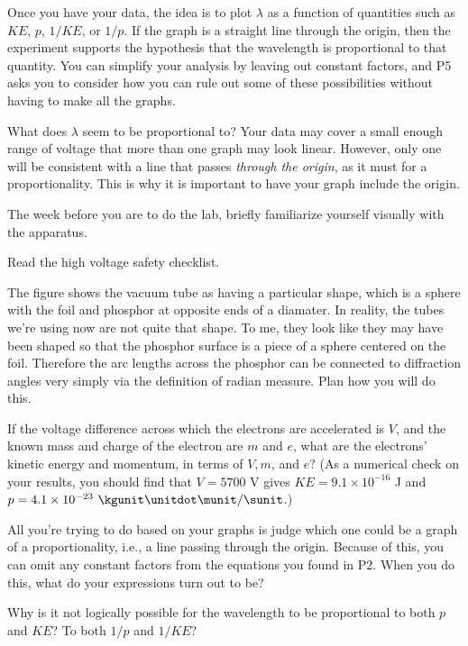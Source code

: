 \analysis

Once you have your data, the idea is to plot $\lambda$ as a function
of quantities such as $KE$, $p$, $1/KE$, or $1/p$.
If the graph is a straight line through the origin, then the experiment
supports the hypothesis that the wavelength is proportional to that
quantity. You can simplify your
analysis by leaving out constant factors, and P5 asks you to consider
how you can rule out some of these possibilities without having
to make all the graphs.

What does $\lambda $ seem to be proportional to? Your data
may cover a small enough range of voltage that more than one
graph may look linear. However, only one will be consistent
with a line that passes \emph{through the origin}, as
it must for a proportionality. This is why it
is important to have your graph include the origin.

\prelab

The week before you are to do the lab, briefly familiarize
yourself visually with the apparatus.

Read the high voltage safety checklist.

\prelabquestion  
The figure  shows the vacuum tube as having
a particular shape, which is a sphere with the foil and phosphor
at opposite ends of a diamater. In reality, the tubes we're using now are not quite that
shape. To me, they look like they may have been shaped so that the phosphor
surface is a piece of a sphere centered on the foil. Therefore the arc lengths across
the phosphor can be connected to diffraction angles very simply via the
definition of radian measure. Plan how you will do this.

\prelabquestion  If the voltage difference across which the electrons are
accelerated is $V$, and the known mass and charge of the
electron are $m$ and $e$, what are the electrons' kinetic
energy and momentum, in terms of $V,m$, and $e?$ (As a
numerical check on your results, you should find that
$V=5700$ V gives $KE=9.1\times10^{-16}$ J and
$p=4.1\times10^{-23}\ \kgunit\unitdot\munit/\sunit$.)

\prelabquestion All you're trying to do based on your graphs is judge which
one could be a graph of a proportionality, i.e., a line passing through the
origin. Because of this, you can omit any constant factors from the equations
you found in P2. When you do this, what do your expressions turn out to be?

\prelabquestion  Why is it not logically possible for the wavelength to
be proportional to both $p$ and $KE$? To both
$1/p$ and $1/KE$?

